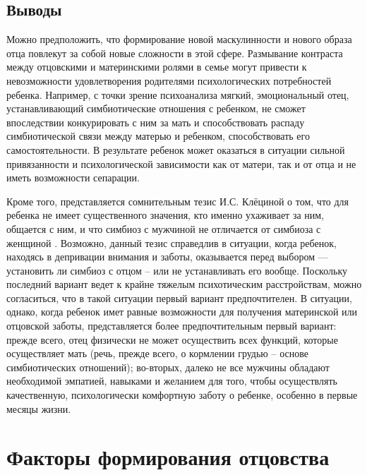 \documentclass{../../common/thesisbyxetex}
\begin{document}
\section{Выводы}

Можно предположить, что формирование новой маскулинности и нового образа отца повлекут за собой
новые сложности в этой сфере. Размывание контраста между отцовскими и материнскими ролями в семье
могут привести к невозможности удовлетворения родителями психологических потребностей ребенка.
Например, с точки зрение психоанализа 	мягкий, эмоциональный отец, устанавливающий симбиотические
отношения с ребенком, не сможет впоследствии конкурировать с ним за мать и способствовать распаду
симбиотической связи между матерью и ребенком, способствовать его самостоятельности. В результате
ребенок может оказаться в ситуации сильной привязанности и психологической зависимости как от
матери, так и от отца и не иметь возможности сепарации.

Кроме того, представляется сомнительным тезис И.С. Клёциной о том, что для ребенка не имеет
существенного значения, кто именно ухаживает за ним, общается с ним, и что симбиоз с мужчиной не
отличается от симбиоза с женщиной \cite{clec}. Возможно, данный тезис справедлив в ситуации, когда
ребенок, находясь в депривации внимания и заботы, оказывается перед выбором --- установить ли
симбиоз с отцом -- или не устанавливать его вообще. Поскольку последний вариант ведет к крайне
тяжелым психотическим расстройствам, можно согласиться, что в такой ситуации первый вариант
предпочтителен. В ситуации, однако, когда ребенок имет равные возможности для получения материнской
или отцовской заботы, представляется более предпочтительным первый вариант: прежде всего, отец
физически не может осуществить всех функций, которые осуществляет мать (речь, прежде всего, о
кормлении грудью -- основе симбиотических отношений); во-вторых, далеко не все мужчины обладают
необходимой эмпатией, навыками и желанием для того, чтобы осуществлять качественную, психологически
комфортную заботу о
ребенке, особенно в первые месяцы жизни.

\chapter{Факторы формирования отцовства}
\end{document}
